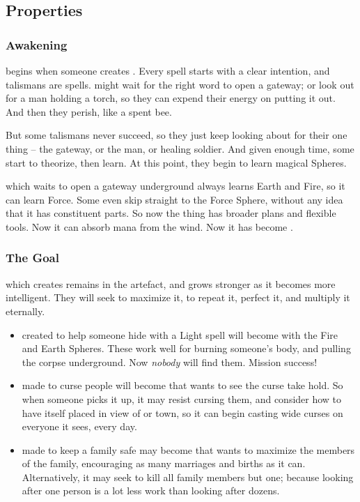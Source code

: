 \begin{multicols}{2}

\subsection{Properties}

\subsubsection{Awakening}
begins when someone creates .
Every spell starts with a clear intention, and \glspl{talisman} are spells.
 might wait for the right word to open a gateway; or look out for a man holding a torch, so they can expend their energy on putting it out.
And then they perish, like a spent bee.

But some \glspl{talisman} never succeed, so they just keep looking about for their one thing -- the gateway, or the man, or healing  soldier.
And given enough time, some start to theorize, then learn.
At this point, they begin to learn magical Spheres.

 which waits to open a gateway underground always learns Earth and Fire, so it can learn Force.
Some even skip straight to the Force Sphere, without any idea that it has constituent parts.
So now the thing has broader plans and flexible tools.
Now it can absorb mana from the wind.
Now it has become .

\subsubsection{The Goal}
which creates  remains in the \gls{artefact}, and grows stronger as it becomes more intelligent.
They will seek to maximize it, to repeat it, perfect it, and multiply it eternally.

\begin{itemize}
  \item
   created to help someone hide with a Light spell will become  with the Fire and Earth Spheres.
  These work well for burning someone's body, and pulling the corpse underground.
  Now \textit{nobody} will find them.
  Mission success!
  \item
   made to curse people will become  that wants to see the curse take hold.
  So when someone picks it up, it may resist cursing them, and consider how to have itself placed in view of  or town, so it can begin casting wide curses on everyone it sees, every day.
  \item
   made to keep a family safe may become  that wants to maximize the members of the family, encouraging as many marriages and births as it can.
  Alternatively, it may seek to kill all family members but one; because looking after one person is a lot less work than looking after dozens.
\end{itemize}


\end{multicols}
